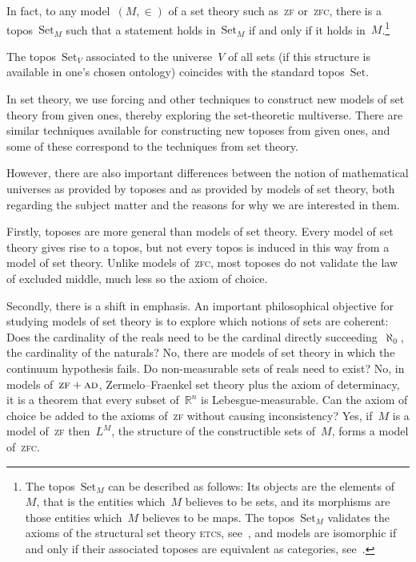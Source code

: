 \documentclass[graybox]{svmult}
\newcommand{\RR}{\mathbb{R}}
\newcommand{\Set}{\mathrm{Set}}
\renewcommand{\_}{\mathpunct{.}\,}
\newcommand{\?}{\,{:}\,}
\begin{document}
In fact, to any model~$(M,\in)$ of a set theory such as~\textsc{zf}
or~\textsc{zfc}, there is a topos~$\Set_M$ such that a statement holds
in~$\Set_M$ if and only if it holds in~$M$.\footnote{The topos~$\Set_M$ can be
described as follows: Its objects are the elements of~$M$, that is the entities
which~$M$ believes to be sets, and its morphisms are those entities which~$M$
believes to be maps. The topos~$\Set_M$ validates the axioms of the structural
set theory \textsc{etcs}, see~\cite{mclarty:structuralism,marquis:foundations,barton-friedman:structures}, and models are isomorphic if and only if their
associated toposes are equivalent as
categories, see~\cite[Section~VI.10]{moerdijk-maclane:sheaves-logic}.}

\begin{example}The topos~$\Set_V$ associated to the universe~$V$ of all sets (if
this structure is available in one's chosen ontology) coincides with the
standard topos~$\Set$.\end{example}

In set theory, we use forcing and other techniques to construct new
models of set theory from given ones, thereby exploring the set-theoretic
multiverse. There are similar techniques available for constructing new toposes
from given ones, and some of these correspond to the techniques from set
theory.

However, there are also important differences between the notion of mathematical
universes as provided by toposes and as provided by models of set theory, both
regarding the subject matter and the reasons for why we are interested in them.

Firstly, toposes are more general than models of set theory. Every model of set
theory gives rise to a topos, but not every topos is induced in this way from a model of set
theory. Unlike models of~\textsc{zfc}, most toposes do not validate the law of excluded middle, much
less so the axiom of choice.

Secondly, there is a shift in emphasis. An important philosophical objective
for studying models of set theory is to explore which notions of sets are
coherent: Does the cardinality of the reals need to be the cardinal directly
succeeding~$\aleph_0$, the cardinality of the naturals? No, there are models of
set theory in which the continuum hypothesis fails. Do non-measurable sets of
reals need to exist? No, in models of~$\textsc{zf}+\textsc{ad}$,
Zermelo--Fraenkel set theory plus the axiom of determinacy, it is a theorem that
every subset of~$\RR^n$ is Lebesgue-measurable. Can the axiom of choice be
added to the axioms of~\textsc{zf} without causing inconsistency? Yes, if~$M$
is a model of~\textsc{zf} then~$L^M$, the structure of the constructible sets of~$M$, forms a
model of~\textsc{zfc}.
\end{document}
